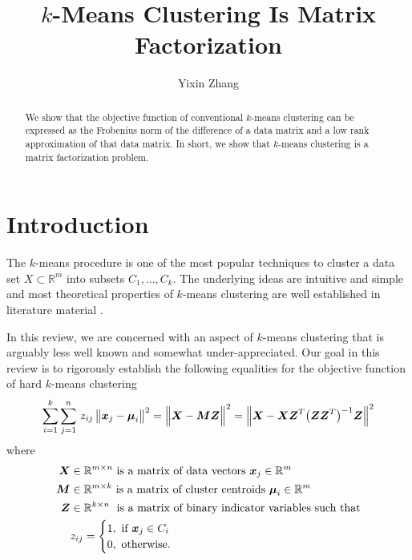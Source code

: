 \documentclass[fleqn]{llncs}
\title{$k$-Means Clustering Is Matrix Factorization}
\author{Yixin Zhang}
\institute{University of Alberta}
\newcommand{\mat}[1]{\boldsymbol{{#1}}}
\renewcommand{\vec}[1]{\boldsymbol{{#1}}}
\newcommand{\dsq}[2]{\bigl \lVert #1 - #2 \bigr \rVert^2}
\newcommand{\DSQ}[2]{\Bigl \lVert #1 - #2 \Bigr \rVert^2}
\begin{document}
\maketitle

\begin{abstract}
We show that the objective function of conventional $k$-means clustering can be expressed as the Frobenius norm of the difference of a data matrix and a low rank approximation of that data matrix. In short, we show that $k$-means clustering is a matrix factorization problem. 
\end{abstract}



\section{Introduction}

The $k$-means procedure is one of the most popular techniques to cluster a data set $X \subset \mathbb{R}^m$ into subsets $C_1, \ldots, C_k$. The underlying ideas are intuitive and simple and most theoretical properties of $k$-means clustering are well established in literature material \cite{MacKay2003-ITI,Hastie2001-TEO}.

In this review, we are concerned with an aspect of $k$-means clustering that is arguably less well known and somewhat under-appreciated. Our goal in this review is to rigorously establish the following equalities for the objective function of hard $k$-means clustering
\begin{equation}
  \label{eq:objective}
  \sum_{i=1}^k \sum_{j=1}^n \, z_{ij} \, \dsq{\vec{x}_j}{\vec{\mu}_i}
  = \DSQ{\mat{X}}{\mat{M} \mat{Z}}
  = \DSQ{\mat{X}}{\mat{X} \mat{Z}^T \bigl(\mat{Z} \mat{Z}^T\bigr)^{-1}\mat{Z}}
\end{equation}
where
\begin{align}
\mat{X} & \in \mathbb{R}^{m \times n} \text{ is a matrix of data vectors } \vec{x}_j \in \mathbb{R}^m  \\
\mat{M} & \in \mathbb{R}^{m \times k} \text{ is a matrix of cluster centroids }  \vec{\mu}_i \in \mathbb{R}^m  \\
\mat{Z} & \in \mathbb{R}^{k \times n} \; \text{ is a matrix of binary indicator variables such that} \notag \\
& z_{ij} =
\begin{cases}
1, \text{ if } \vec{x}_j \in C_i  \\
0, \text{ otherwise.}
\end{cases}
\label{eq:matZ}
\end{align}
\end{document}
